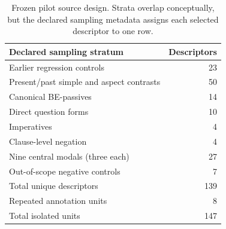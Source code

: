 \begin{table}[t]
  \centering
  \small
  \begin{tabularx}{\columnwidth}{@{}Xr@{}}
    \toprule
    Declared sampling stratum & Descriptors \\
    \midrule
    Earlier regression controls & 23 \\
    Present/past simple and aspect contrasts & 50 \\
    Canonical BE-passives & 14 \\
    Direct question forms & 10 \\
    Imperatives & 4 \\
    Clause-level negation & 4 \\
    Nine central modals (three each) & 27 \\
    Out-of-scope negative controls & 7 \\
    \midrule
    Total unique descriptors & 139 \\
    Repeated annotation units & 8 \\
    Total isolated units & 147 \\
    \bottomrule
  \end{tabularx}
  \caption{Frozen pilot source design.  Strata overlap conceptually, but the
  declared sampling metadata assigns each selected descriptor to one row.}
  \label{tab:sample-design}
\end{table}
